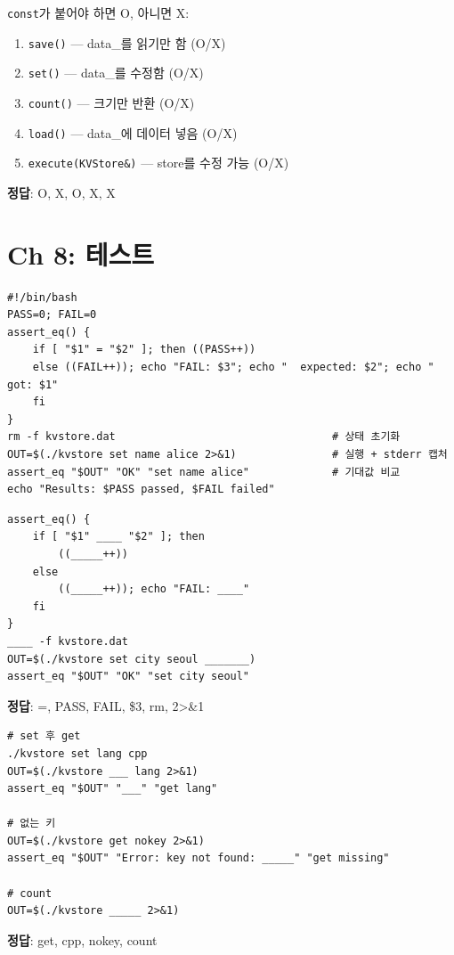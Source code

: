 \documentclass[11pt,a4paper]{article}
\newcommand{\code}[1]{\texttt{#1}}
\begin{document}
\begin{quizbox}[title={Q7-2: const 판단}]
\code{const}가 붙어야 하면 O, 아니면 X:
\begin{enumerate}[nosep]
\item \code{save()} --- data\_를 읽기만 함 (O/X)
\item \code{set()} --- data\_를 수정함 (O/X)
\item \code{count()} --- 크기만 반환 (O/X)
\item \code{load()} --- data\_에 데이터 넣음 (O/X)
\item \code{execute(KVStore\&)} --- store를 수정 가능 (O/X)
\end{enumerate}
\textbf{정답}: O, X, O, X, X
\end{quizbox}


\section{Ch 8: 테스트}

\begin{lstlisting}[style=shell,title={test.sh 구조}]
#!/bin/bash
PASS=0; FAIL=0
assert_eq() {
    if [ "$1" = "$2" ]; then ((PASS++))
    else ((FAIL++)); echo "FAIL: $3"; echo "  expected: $2"; echo "  got: $1"
    fi
}
rm -f kvstore.dat                                  # 상태 초기화
OUT=$(./kvstore set name alice 2>&1)               # 실행 + stderr 캡처
assert_eq "$OUT" "OK" "set name alice"             # 기대값 비교
echo "Results: $PASS passed, $FAIL failed"
\end{lstlisting}

\begin{quizbox}[title={Q8-1: test.sh}]
\begin{lstlisting}[style=shell,numbers=none]
assert_eq() {
    if [ "$1" ____ "$2" ]; then
        ((_____++))
    else
        ((_____++)); echo "FAIL: ____"
    fi
}
____ -f kvstore.dat
OUT=$(./kvstore set city seoul _______)
assert_eq "$OUT" "OK" "set city seoul"
\end{lstlisting}
\textbf{정답}: =, PASS, FAIL, \$3, rm, 2>\&1
\end{quizbox}

\begin{quizbox}[title={Q8-2: 테스트 코드 작성}]
\begin{lstlisting}[style=shell,numbers=none]
# set 후 get
./kvstore set lang cpp
OUT=$(./kvstore ___ lang 2>&1)
assert_eq "$OUT" "___" "get lang"

# 없는 키
OUT=$(./kvstore get nokey 2>&1)
assert_eq "$OUT" "Error: key not found: _____" "get missing"

# count
OUT=$(./kvstore _____ 2>&1)
\end{lstlisting}
\textbf{정답}: get, cpp, nokey, count
\end{quizbox}
\end{document}
